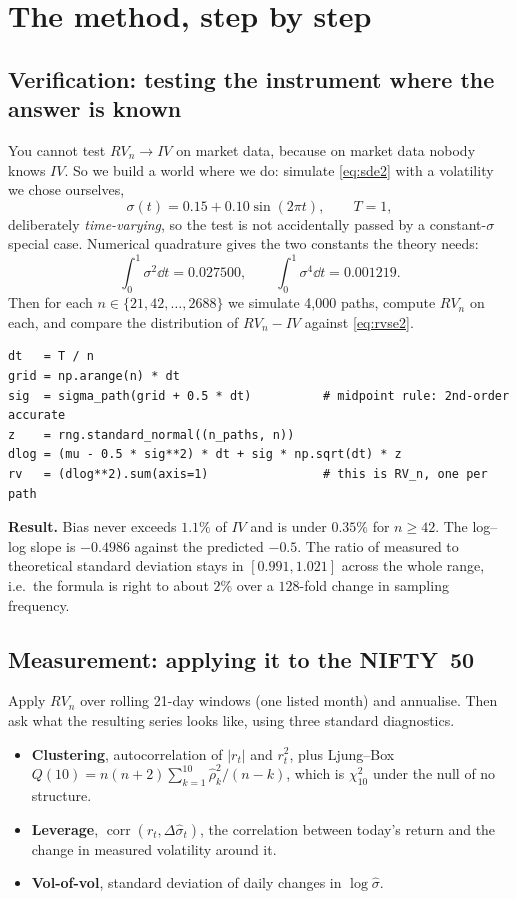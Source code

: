 \documentclass[11pt,a4paper]{article}
\begin{document}
\section{The method, step by step}
\label{sec:method}

\subsection{Verification: testing the instrument where the answer is known}

You cannot test $RV_n\to IV$ on market data, because on market data nobody knows $IV$. So we
build a world where we do: simulate \eqref{eq:sde2} with a volatility we chose ourselves,
\[
\sigma(t)=0.15+0.10\sin(2\pi t),\qquad T=1,
\]
deliberately \emph{time-varying}, so the test is not accidentally passed by a constant-$\sigma$
special case. Numerical quadrature gives the two constants the theory needs:
\[
\int_0^1\sigma^2\dd t=0.027500,\qquad \int_0^1\sigma^4\dd t=0.001219 .
\]
Then for each $n\in\{21,42,\dots,2688\}$ we simulate 4{,}000 paths, compute $RV_n$ on each,
and compare the distribution of $RV_n-IV$ against \eqref{eq:rvse2}.

\begin{lstlisting}[style=py]
dt   = T / n
grid = np.arange(n) * dt
sig  = sigma_path(grid + 0.5 * dt)          # midpoint rule: 2nd-order accurate
z    = rng.standard_normal((n_paths, n))
dlog = (mu - 0.5 * sig**2) * dt + sig * np.sqrt(dt) * z
rv   = (dlog**2).sum(axis=1)                # this is RV_n, one per path
\end{lstlisting}

\textbf{Result.} Bias never exceeds $1.1\%$ of $IV$ and is under $0.35\%$ for $n\ge42$. The
log--log slope is $-0.4986$ against the predicted $-0.5$. The ratio of measured to theoretical
standard deviation stays in $[0.991,1.021]$ across the whole range, i.e.\ the formula is
right to about $2\%$ over a $128$-fold change in sampling frequency.

\subsection{Measurement: applying it to the NIFTY~50}

Apply $RV_n$ over rolling 21-day windows (one listed month) and annualise. Then ask what the
resulting series looks like, using three standard diagnostics.

\begin{itemize}[leftmargin=*,topsep=1pt,itemsep=2pt]
\item \textbf{Clustering}, autocorrelation of $|r_t|$ and $r_t^2$, plus Ljung--Box
      $Q(10)=n(n+2)\sum_{k=1}^{10}\hat\rho_k^2/(n-k)$, which is $\chi^2_{10}$ under the null of
      no structure.
\item \textbf{Leverage}, $\operatorname{corr}(r_t,\Delta\hat\sigma_t)$, the correlation
      between today's return and the change in measured volatility around it.
\item \textbf{Vol-of-vol}, standard deviation of daily changes in $\log\hat\sigma$.
\end{itemize}
\end{document}
